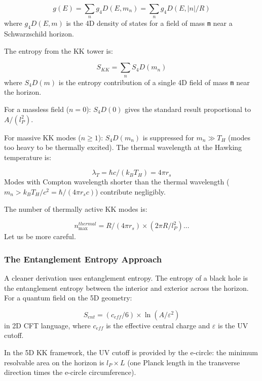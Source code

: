 \documentclass[aps,prd,preprint,superscriptaddress,longbibliography,floatfix]{revtex4-2}
\theoremstyle{remark}
\begin{document}
\begin{equation}
    g(E) = \sum_n g_{4}D(E, m_n) = \sum_n g_{4}D(E, |n|/R)
\end{equation}
where $g_{4}D(E, m)$ is the 4D density of states for a field of mass \texttt{m} near a Schwarzschild horizon.

The entropy from the KK tower is:


\begin{equation}
    S_{KK} = \sum_n S_{4}D(m_n)
\end{equation}
where $S_{4}D(m)$ is the entropy contribution of a single 4D field of mass \texttt{m} near the horizon.

For a massless field ($n = 0$): $S_{4}D(0)$ gives the standard result proportional to $A/(l_P^{2})$.

For massive KK modes ($n \geq 1$): $S_{4}D(m_n)$ is suppressed for $m_n \gg T_H$ (modes too heavy to be thermally excited). The thermal wavelength at the Hawking temperature is:


\begin{equation}
    \lambda_T = \hbar c/(k_B T_H) = 4\pi r_s
\end{equation}
Modes with Compton wavelength shorter than the thermal wavelength ($m_n > k_B T_H/c^{2} = \hbar/(4\pi r_s c)$) contribute negligibly.

The number of thermally active KK modes is:


\begin{equation}
    n_{\max}^{thermal} = R/(4\pi r_s) \times (2\pi R/l_P^{2}) ...
\end{equation}
Let us be more careful.


\subsubsection{The Entanglement Entropy Approach}

A cleaner derivation uses entanglement entropy. The entropy of a black hole is the entanglement entropy between the interior and exterior across the horizon. For a quantum field on the 5D geometry:


\begin{equation}
    S_{ent} = (c_{eff}/6) \times \ln(A/\varepsilon^{2})
\end{equation}
in 2D CFT language, where $c_{eff}$ is the effective central charge and $\varepsilon$ is the UV cutoff.

In the 5D KK framework, the UV cutoff is provided by the e-circle: the minimum resolvable area on the horizon is $l_P \times L$ (one Planck length in the transverse direction times the e-circle circumference).
\end{document}
